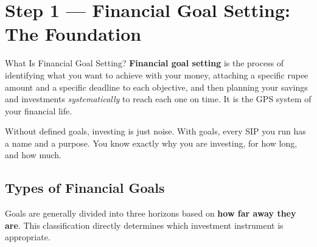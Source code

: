 \documentclass[12pt,a4paper]{article}
\begin{document}
\section{Step 1 --- Financial Goal Setting: The Foundation}

\begin{conceptbox}{What Is Financial Goal Setting?}
\textbf{Financial goal setting} is the process of identifying what you want to achieve with your money, attaching a specific rupee amount and a specific deadline to each objective, and then planning your savings and investments \textit{systematically} to reach each one on time. It is the GPS system of your financial life.
\end{conceptbox}

Without defined goals, investing is just noise. With goals, every SIP you run has a name and a purpose. You know exactly why you are investing, for how long, and how much.

\subsection{Types of Financial Goals}

Goals are generally divided into three horizons based on \textbf{how far away they are}. This classification directly determines which investment instrument is appropriate.

\vspace{3mm}
\end{document}
